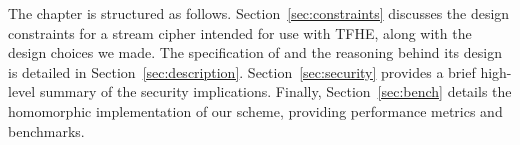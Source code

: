 The chapter is structured as follows. Section~\ref{sec:constraints} discusses the design constraints for a stream cipher intended for use with TFHE, along with the design choices we made. The specification of \coolName{} and the reasoning behind its design is detailed in Section~\ref{sec:description}. Section~\ref{sec:security} provides a brief high-level summary of the security implications. Finally, Section~\ref{sec:bench} details the homomorphic implementation of our scheme, providing performance metrics and benchmarks.


